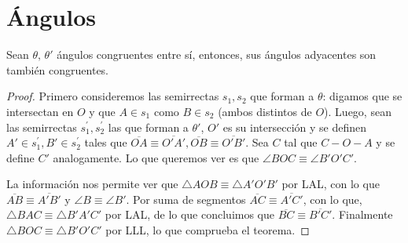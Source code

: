 \documentclass[11pt,a4paper]{book}
\begin{document}
\section{Ángulos}
\begin{thm}
Sean $\theta,\,\theta'$ ángulos congruentes entre sí, entonces, sus ángulos adyacentes son también congruentes.
\end{thm}
\begin{proof}
Primero consideremos las semirrectas $s_1,s_2$ que forman a $\theta$: digamos que se intersectan en $O$ y que $A\in s_1$ como $B\in s_2$ (ambos distintos de $O$). Luego, sean las semirrectas $s_1^\prime,s_2^\prime$ las que forman a $\theta'$, $O'$ es su intersección y se definen $A'\in s_1^\prime,B'\in s_2^\prime$ tales que $\overline{OA}\equiv\overline{O'A'},\overline{OB}\equiv\overline{O'B'}$. Sea $C$ tal que $C-O-A$ y se define $C'$ analogamente. Lo que queremos ver es que $\angle BOC\equiv\angle B'O'C'$.
\begin{figure}
\centering
{}
\end{figure}

La información nos permite ver que $\triangle AOB\equiv\triangle A'O'B'$ por LAL, con lo que $\overline{AB}\equiv\overline{A'B'}$ y $\angle B\equiv\angle B'$. Por suma de segmentos $\overline{AC}\equiv\overline{A'C'}$, con lo que, $\triangle BAC\equiv\triangle B'A'C'$ por LAL, de lo que concluimos que $\overline{BC}\equiv\overline{B'C'}$. Finalmente $\triangle BOC\equiv\triangle B'O'C'$ por LLL, lo que comprueba el teorema.
\end{proof}
\end{document}
